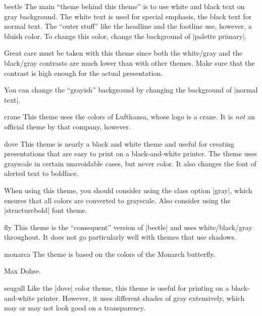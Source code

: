 \begin{colorthemeexample}{beetle}
  The main ``theme behind this theme'' is to use white and black text on gray background. The white text is used for special emphasis, the black text for normal text. The ``outer stuff'' like the headline and the footline use, however, a bluish color. To change this color, change the background of |palette primary|.

  Great care must be taken with this theme since both the white/gray and the black/gray contrasts are much lower than with other themes. Make sure that the contrast is high enough for the actual presentation.

  You can change the ``grayish'' background by changing the background of |normal text|.
\end{colorthemeexample}

\begin{colorthemeexample}{crane}
  This theme uses the colors of Lufthansa, whose logo is a crane. It is \emph{not} an official theme by that company, however.
\end{colorthemeexample}

\begin{colorthemeexample}{dove}
  This theme is nearly a black and white theme and useful for creating presentations that are easy to print on a black-and-white printer. The theme uses grayscale in certain unavoidable cases, but never color. It also changes the font of alerted text to boldface.

  When using this theme, you should consider using the class option |gray|, which ensures that all colors are converted to grayscale. Also consider using the |structurebold| font theme.
\end{colorthemeexample}

\begin{colorthemeexample}{fly}
  This theme is the ``consequent'' version of |beetle| and uses white/black/gray throughout. It does not go particularly well with themes that use shadows.
\end{colorthemeexample}

\begin{colorthemeexample}{monarca}
  The theme is based on the colors of the Monarch butterfly.
  
  \themeauthor Max Dohse.
\end{colorthemeexample}

\begin{colorthemeexample}{seagull}
  Like the |dove| color theme, this theme is useful for printing on a black-and-white printer. However, it uses different shades of gray extensively, which may or may not look good on a transparency.
\end{colorthemeexample}

